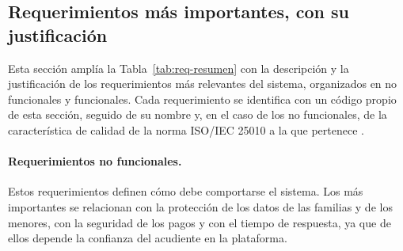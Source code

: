\subsection{Requerimientos más importantes, con su justificación}
\label{anx:requerimientos}

Esta sección amplía la Tabla~\ref{tab:req-resumen} con la descripción y la justificación de los requerimientos más relevantes del sistema, organizados en no
funcionales y funcionales. Cada requerimiento se identifica con un código propio de esta
sección, seguido de su nombre y, en el caso de los no funcionales, de la característica de
calidad de la norma ISO/IEC 25010 a la que pertenece \citep{iso_25010_2011}.\par

\paragraph{Requerimientos no funcionales.} Estos requerimientos definen cómo debe comportarse
el sistema. Los más importantes se relacionan con la protección de los datos de las familias
y de los menores, con la seguridad de los pagos y con el tiempo de respuesta, ya que de ellos
depende la confianza del acudiente en la plataforma.\par

